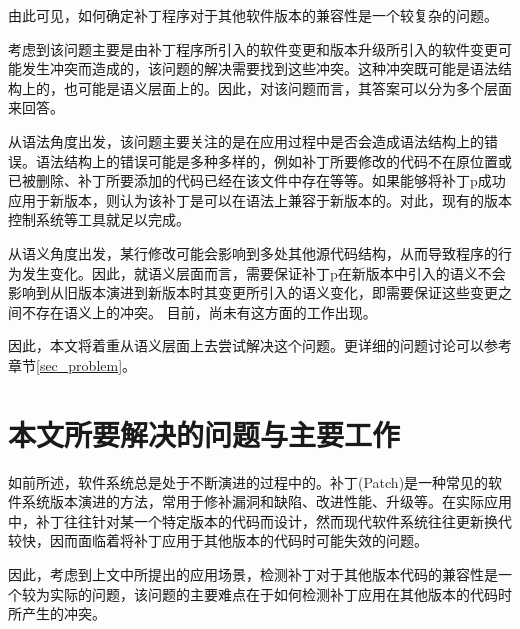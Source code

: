 由此可见，如何确定补丁程序对于其他软件版本的兼容性是一个较复杂的问题。

考虑到该问题主要是由补丁程序所引入的软件变更和版本升级所引入的软件变更可能发生冲突而造成的，该问题的解决需要找到这些冲突。这种冲突既可能是语法结构上的，也可能是语义层面上的。因此，对该问题而言，其答案可以分为多个层面来回答。

从语法角度出发，该问题主要关注的是在应用过程中是否会造成语法结构上的错误。语法结构上的错误可能是多种多样的，例如补丁所要修改的代码不在原位置或已被删除、补丁所要添加的代码已经在该文件中存在等等。如果能够将补丁p成功应用于新版本，则认为该补丁是可以在语法上兼容于新版本的。对此，现有的版本控制系统等工具就足以完成。

从语义角度出发，某行修改可能会影响到多处其他源代码结构，从而导致程序的行为发生变化。因此，就语义层面而言，需要保证补丁p在新版本中引入的语义不会影响到从旧版本演进到新版本时其变更所引入的语义变化，即需要保证这些变更之间不存在语义上的冲突。
目前，尚未有这方面的工作出现。

因此，本文将着重从语义层面上去尝试解决这个问题。更详细的问题讨论可以参考章节\ref {sec_problem}。


\section{本文所要解决的问题与主要工作}

如前所述，软件系统总是处于不断演进的过程中的。补丁(Patch)是一种常见的软件系统版本演进的方法，常用于修补漏洞和缺陷、改进性能、升级等。在实际应用中，补丁往往针对某一个特定版本的代码而设计，然而现代软件系统往往更新换代较快，因而面临着将补丁应用于其他版本的代码时可能失效的问题。


因此，考虑到上文中所提出的应用场景，检测补丁对于其他版本代码的兼容性是一个较为实际的问题，该问题的主要难点在于如何检测补丁应用在其他版本的代码时所产生的冲突。


%

